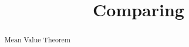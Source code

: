 \documentclass{ximera}
\title{Comparing}
\begin{document}
\begin{abstract}
Mean Value Theorem
\end{abstract}
\maketitle
\end{document}
